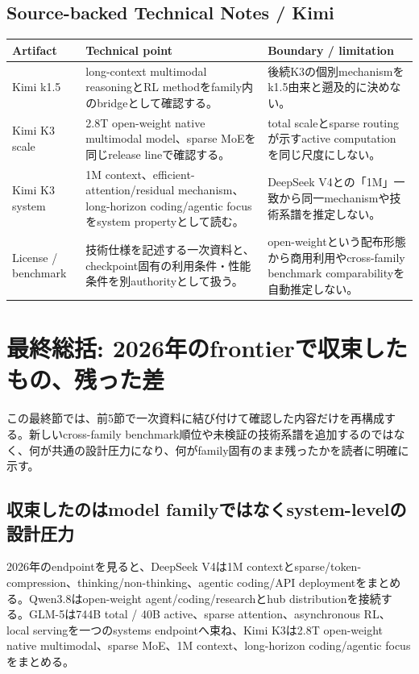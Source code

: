 \documentclass[lualatex,a4paper,10pt]{jlreq}
\begin{document}
\subsection*{Source-backed Technical Notes / Kimi}
\small
\begin{tabularx}{\textwidth}{@{}>{\raggedright\arraybackslash}p{}>{\raggedright\arraybackslash}p{}>{\raggedright\arraybackslash}X@{}}
\toprule
Artifact & Technical point & Boundary / limitation \\
\midrule
Kimi k1.5 & long-context multimodal reasoningとRL methodをfamily内のbridgeとして確認する。 & 後続K3の個別mechanismをk1.5由来と遡及的に決めない。 \\
Kimi K3 scale & 2.8T open-weight native multimodal model、sparse MoEを同じrelease lineで確認する。 & total scaleとsparse routingが示すactive computationを同じ尺度にしない。 \\
Kimi K3 system & 1M context、efficient-attention/residual mechanism、long-horizon coding/agentic focusをsystem propertyとして読む。 & DeepSeek V4との「1M」一致から同一mechanismや技術系譜を推定しない。 \\
License / benchmark & 技術仕様を記述する一次資料と、checkpoint固有の利用条件・性能条件を別authorityとして扱う。 & open-weightという配布形態から商用利用やcross-family benchmark comparabilityを自動推定しない。 \\
\bottomrule
\end{tabularx}
\normalsize
\autocite{kimik15,kimik3}

\section{最終総括: 2026年のfrontierで収束したもの、残った差}
\label{sec:synthesis}

この最終節では、前5節で一次資料に結び付けて確認した内容だけを再構成する。新しいcross-family benchmark順位や未検証の技術系譜を追加するのではなく、何が共通の設計圧力になり、何がfamily固有のまま残ったかを読者に明確に示す。

\subsection{収束したのはmodel familyではなくsystem-levelの設計圧力}
2026年のendpointを見ると、DeepSeek V4は1M contextとsparse/token-compression、thinking/non-thinking、agentic coding/API deploymentをまとめる。Qwen3.8はopen-weight agent/coding/researchとhub distributionを接続する。GLM-5は744B total / 40B active、sparse attention、asynchronous RL、local servingを一つのsystems endpointへ束ね、Kimi K3は2.8T open-weight native multimodal、sparse MoE、1M context、long-horizon coding/agentic focusをまとめる。\autocite{deepseekv4,qwen38,glm5,kimik3}
\end{document}
